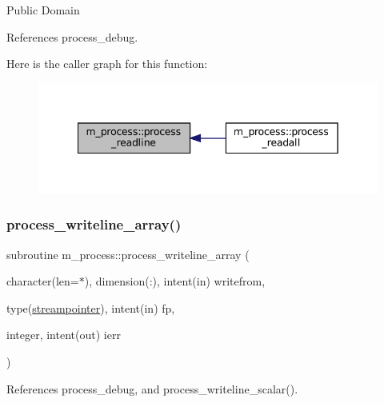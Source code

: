 Public Domain 

References process\+\_\+debug.

Here is the caller graph for this function\+:
\nopagebreak
\begin{figure}[H]
\begin{center}
\leavevmode
\includegraphics[width=342pt]{namespacem__process_acbc72c5ed371430a471aa1f3010fbbda_icgraph}
\end{center}
\end{figure}
\mbox{\label{namespacem__process_a08887a918eba167ceacddf58ca084270}} 
\subsubsection{\texorpdfstring{process\+\_\+writeline\+\_\+array()}{process\_writeline\_array()}}
{\footnotesize\ttfamily subroutine m\+\_\+process\+::process\+\_\+writeline\+\_\+array (\begin{DoxyParamCaption}\item[{character(len=$\ast$), dimension(\+:), intent(in)}]{writefrom,  }\item[{type(\mbox{\hyperlink{structm__process_1_1streampointer}{streampointer}}), intent(in)}]{fp,  }\item[{integer, intent(out)}]{ierr }\end{DoxyParamCaption})\hspace{0.3cm}{\ttfamily [private]}}



References process\+\_\+debug, and process\+\_\+writeline\+\_\+scalar().

